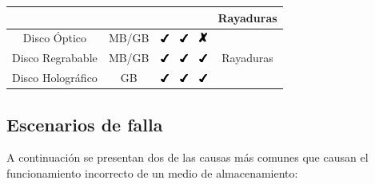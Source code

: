 \begin{table}[H]
{\begin{tabular}{c|c|c|c|c|c}
 & & & & & Rayaduras \\
\hline
Disco \'{O}ptico & MB/GB & \includegraphics[keepaspectratio=true, width=10px]{figures/Y} & \includegraphics[keepaspectratio=true, width=10px]{figures/Y} & \includegraphics[keepaspectratio=true, width=10px]{figures/N} & \multirow{3}{*}{Rayaduras} \\
\cline{1-5}
Disco Regrabable & MB/GB & \includegraphics[keepaspectratio=true, width=10px]{figures/Y} & \includegraphics[keepaspectratio=true, width=10px]{figures/Y} & \includegraphics[keepaspectratio=true, width=10px]{figures/Y} &  \\
\cline{1-5}
Disco Hologr\'{a}fico & GB & \includegraphics[keepaspectratio=true, width=10px]{figures/Y} & \includegraphics[keepaspectratio=true, width=10px]{figures/Y} & \includegraphics[keepaspectratio=true, width=10px]{figures/Y} & \\
\end{tabular}
} %
\end{table}

  \subsection {Escenarios de falla}

A continuaci\'{o}n se presentan dos de las causas m\'{a}s comunes que causan el funcionamiento incorrecto de un medio de almacenamiento:

